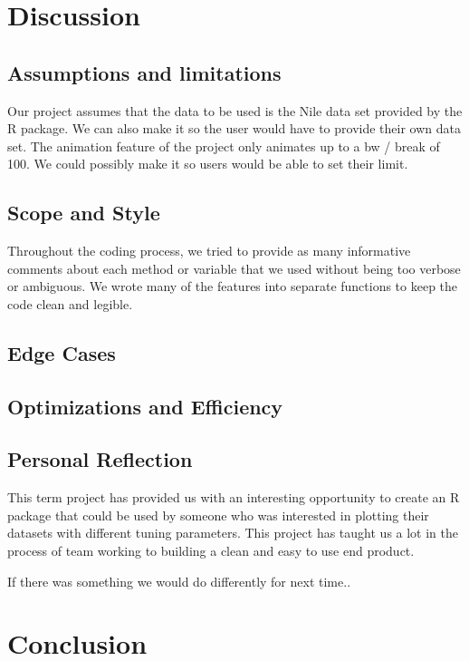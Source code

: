 \documentclass{article}
\begin{document}
\section{Discussion}
\subsection{Assumptions and limitations}
Our project assumes that the data to be used is the Nile data set provided by the R package. We can also make it so the user would have to provide their own data set. 
The animation feature of the project only animates up to a bw / break of 100. We could possibly make it so users would be able to set their limit. 

\subsection{Scope and Style}
Throughout the coding process, we tried to provide as many informative comments about each method or variable that we used without being too verbose or ambiguous. We wrote many of the features into separate functions to keep the code clean and legible. 

\subsection{Edge Cases}

\subsection{Optimizations and Efficiency}


\subsection{Personal Reflection}
This term project has provided us with an interesting opportunity to create an R package that could be used by someone who was interested in plotting their datasets with different tuning parameters. 
This project has taught us a lot in the process of team working to building a clean and easy to use end product. 

If there was something we would do differently for next time..

\section{Conclusion}

%
%
\end{document}
